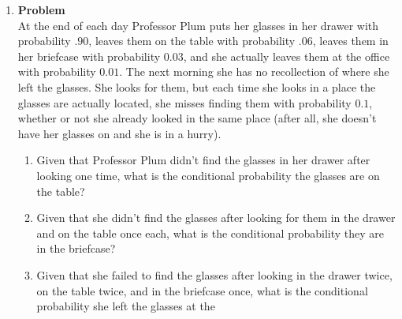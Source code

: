 \documentclass[12pt]{article}
\newenvironment{Ex}{\textbf{Problem}\vspace{.75em}\\}{}
\begin{document}
\begin{enumerate}
\begin{Ex}
\begin{solution}
\begin{enumerate}
\begin{equation}
\begin{aligned}
            &= 0.075
          \end{aligned}
        \end{equation}
      \item This is due to the Base Rate Fallacy. The specific
        information ($P(X|D)$) is incorrectly focused on when a more
        correct assessment should look at both the specific
        information and the general information ($\alpha = 0.1$).
      \item The probability that a person has the disease given that
        both tests are positive should increase because the percent of
        the population who actually have the disease has increased.
      \item Yes. The results of one test do not influence the results
        of the other, and vice versa. No new information about the
        results of the second test can be derived from the results of
        the first.
      \end{enumerate}
    \end{solution}
  \end{Ex}
\item
  \begin{Ex}
    At the end of each day Professor Plum puts her glasses in her
    drawer with probability $.90$, leaves them on the table with
    probability $.06$, leaves them in her briefcase with probability
    $0.03$, and she actually leaves them at the office with
    probability $0.01$. The next morning she has no recollection of
    where she left the glasses. She looks for them, but each time she
    looks in a place the glasses are actually located, she misses
    finding them with probability $0.1$, whether or not she already
    looked in the same place (after all, she doesn't have her glasses
    on and she is in a hurry).
    \begin{enumerate}
    \item Given that Professor Plum didn't find the glasses in her
      drawer after looking one time, what is the conditional
      probability the glasses are on the table?
    \item Given that she didn't find the glasses after looking for them
      in the drawer and on the table once each, what is the
      conditional probability they are in the briefcase?
    \item Given that she failed to find the glasses after looking in
      the drawer twice, on the table twice, and in the briefcase once,
      what is the conditional probability she left the glasses at the

\end{enumerate}
\end{Ex}
\end{enumerate}
\end{document}
